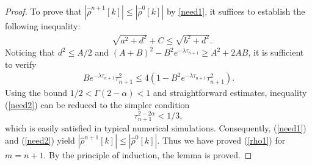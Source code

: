 \documentclass[10pt, reqno]{amsart}
\theoremstyle{remark}
\theoremstyle{definition}
\numberwithin{table}{section}
\begin{document}
\begin{proof}
To prove that $|\hat{\rho}^{n+1}[k]|\leq |\hat{\rho}^{0}[k]|$ by \eqref{need1}, it suffices to establish the following inequality:
\begin{align*}
& \sqrt{a^2 + d^2} + C \le \sqrt{b^2 + d^2}.
\end{align*}
Noticing that $d^2 \leq {A}/{2}$ and $(A+B)^2-B^2e^{-\lambda\tau_{n+1}}\geq A^2+2AB$, it is sufficient to verify
\begin{align}
    {Be^{-\lambda\tau_{n+1}}\tau_{n+1}^2}\leq 4({1-B^2e^{-\lambda\tau_{n+1}}\tau_{n+1}^2}).\label{need2}
\end{align}
Using the bound \(1/2<\Gamma(2-\alpha)<1\) and straightforward estimates, inequality (\ref{need2}) can be reduced to the simpler condition
\[
\tau_{n+1}^{2-2\alpha}<1/3,
\]
which is easily satisfied in typical numerical simulations. Consequently, (\ref{need1}) and (\ref{need2}) yield \(|\hat{\rho}^{n+1}[k]|\leq |\hat{\rho}^{0}[k]|\). Thus we
have proved (\ref{rho1}) for $m = n+1$. By the principle of induction, the lemma is proved.
\end{proof}
\end{document}
